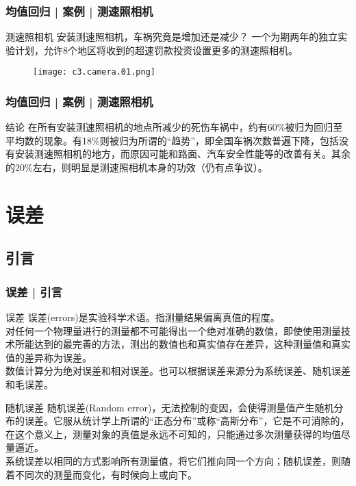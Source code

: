 \begin{frame}
  \frametitle{均值回归 | 案例 | 测速照相机}
  \begin{block}{测速照相机}
    安装测速照相机，车祸究竟是增加还是减少？
    一个为期两年的独立实验计划，允许8个地区将收到的超速罚款投资设置更多的测速照相机。
  \end{block}
  \begin{figure}
    \centering
    \texttt{[image: c3.camera.01.png]}
  \end{figure}
\end{frame}

\begin{frame}
  \frametitle{均值回归 | 案例 | 测速照相机}
  \begin{block}{结论}
    在所有安装测速照相机的地点所减少的死伤车祸中，约有60\%被归为回归至平均数的现象。有18\%则被归为所谓的“趋势”，即全国车祸次数普遍下降，包括没有安装测速照相机的地方，而原因可能和路面、汽车安全性能等的改善有关。其余的20\%左右，则明显是测速照相机本身的功效（仍有点争议）。
  \end{block}
\end{frame}

\section{误差}
\subsection{引言}
\begin{frame}
  \frametitle{误差 | 引言}
  \begin{block}{误差}
    误差(errors)是实验科学术语。指测量结果偏离真值的程度。\\
    \vspace{0.3em}
对任何一个物理量进行的测量都不可能得出一个绝对准确的数值，即使使用测量技术所能达到的最完善的方法，测出的数值也和真实值存在差异，这种测量值和真实值的差异称为误差。\\
\vspace{0.3em}
数值计算分为绝对误差和相对误差。也可以根据误差来源分为系统误差、随机误差和毛误差。
  \end{block}
  \pause
  \begin{block}{随机误差}
    随机误差(Random error)，无法控制的变因，会使得测量值产生随机分布的误差。它服从统计学上所谓的“正态分布”或称“高斯分布”，它是不可消除的，在这个意义上，测量对象的真值是永远不可知的，只能通过多次测量获得的均值尽量逼近。\\
    \vspace{0.3em}
    系统误差以相同的方式影响所有测量值，将它们推向同一个方向；随机误差，则随着不同次的测量而变化，有时候向上或向下。
  \end{block}
\end{frame}

